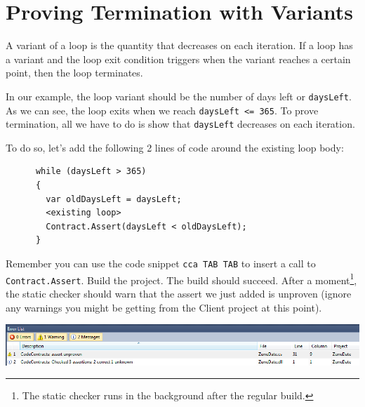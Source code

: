 \documentclass{article}
\newcommand{\code}[1]{\lstinline{#1}}
\begin{document}
\section{Proving Termination with Variants}
A variant of a loop is the quantity that decreases on each
iteration. If a loop has a variant and the loop exit
condition triggers when the variant reaches a certain point, then the
loop terminates.

In our example, the loop variant should be the number of days left or
\lstinline{daysLeft}. As we can see, the loop exits when we reach
\lstinline{daysLeft <= 365}. To prove termination, all we have to do
is show that \lstinline{daysLeft} decreases on each iteration.

To do so, let's add the following 2 lines of code around the existing
loop body:
\begin{lstlisting}
      while (daysLeft > 365)
      {
        var oldDaysLeft = daysLeft;
        <existing loop>
        Contract.Assert(daysLeft < oldDaysLeft);
      }
\end{lstlisting}
Remember you can use the code snippet \code{cca TAB TAB} to insert a call to
\code{Contract.Assert}.
Build the project. The build should succeed. After a
moment\footnote{The static checker runs in the background after the regular build.}, 
the static checker should warn that the assert we just added is
unproven (ignore any warnings you might be getting from the Client
project at this point).
\begin{center}
  \includegraphics[width=1\columnwidth]{errors1.png}
\end{center}
\end{document}
